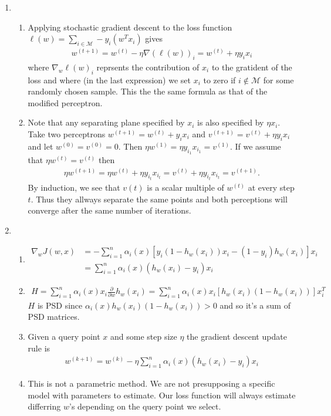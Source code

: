 \documentclass[11pt,letter]{article}
\begin{document}
\begin{enumerate}
\item \begin{enumerate}
    \item Applying stochastic gradient descent to the loss function $\ell(w) = \underset{i \in \mathcal M}{\sum} - y_i(w^Tx_i)$ gives
    \begin{align*}
        w^{(t+1)} = w^{(t)} - \eta \nabla(\ell(w))_i = w^{(t)} + \eta y_ix_i
    \end{align*}
    where $\nabla_w\ell(w)_i$ reprsents the contribution of $x_i$ to the gratident of the loss and where (in the last expression) we set $x_i$ to zero if $i \notin \mathcal M$ for some randomly chosen sample. 
    This the the same formula as that of the modified perceptron.
    \item Note that any separating plane specified by $x_i$ is also specified by $\eta x_i$. Take two perceptrons $w^{(t+1)} = w^{(t)} + y_ix_i$ and $v^{(t+1)} = v^{(t)} + \eta y_ix_i$ and let $w^{(0)} = v^{(0)} = 0$. Then $\eta w^{(1)} = \eta y_{i_1} x_{i_1} = v^{(1)}$. If we assume that $\eta w^{(t)} = v^{(t)}$ then
    \begin{align*}
        \eta w^{(t+1)} = \eta w^{(t)} + \eta y_{i_t} x_{i_t} = v^{(t)} + \eta y_{i_t} x_{i_t} = v^{(t+1)}.
    \end{align*}
    By induction, we see that $v{(t)}$ is a scalar multiple of $w^{(t)}$ at every step $t$. Thus they allways separate the same points and both perceptions will converge after the same number of iterations.
    \end{enumerate}

\item \begin{enumerate}
    \item \begin{align*}
        \nabla_w J(w,x) & = -\sum_{i=1}^n \alpha_i(x)[y_i(1 - h_w(x_i))x_i - (1-y_i)h_w(x_i)]x_i \\ & = \sum_{i=1}^n \alpha_i(x)(h_w(x_i) - y_i)x_i
    \end{align*}
    \item \begin{align*}
        H = \sum_{i=1}^n \alpha_i(x) x_i \frac{\partial}{\partial w} h_w(x_i) = \sum_{i=1}^n \alpha_i(x) x_i [h_w(x_i)(1 - h_w(x_i))] x_i^T
    \end{align*}
    $H$ is PSD since $\alpha_i(x)h_w(x_i)(1 - h_w(x_i)) > 0$ and so it's a sum of PSD matrices.
    \item Given a query point $x$ and some step size $\eta$ the gradient descent update rule is
    \begin{align*}
        w^{(k+1)} = w^{(k)} - \eta \sum_{i=1}^n \alpha_i(x)(h_w(x_i) - y_i)x_i
    \end{align*}
    \item This is not a parametric method. We are not presupposing a specific model with parameters to estimate. Our loss function will always estimate differring $w$'s depending on the query point we select.
    \end{enumerate}


\end{enumerate}
\end{document}
